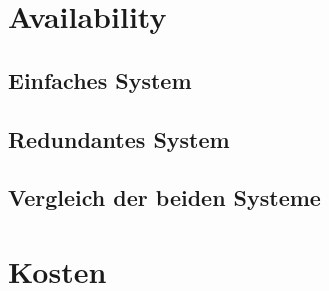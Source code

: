\documentclass[10pt,a4paper]{article}
\begin{document}
\section{Availability}
\subsection{Einfaches System}
\subsection{Redundantes System}
\subsection{Vergleich der beiden Systeme}
\section{Kosten}
\end{document}
